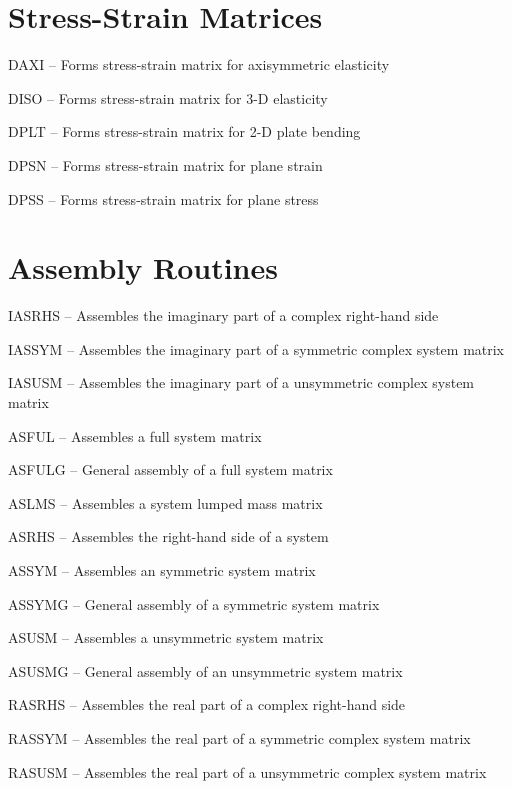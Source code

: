 \section{Stress-Strain Matrices}
\begin{list}{}{\leftmargin=57pt }
\item[DAXI \hfill]   -- Forms stress-strain matrix for axisymmetric elasticity
\item[DISO \hfill]   -- Forms stress-strain matrix for 3-D elasticity
\item[DPLT \hfill]   -- Forms stress-strain matrix for 2-D plate bending
\item[DPSN \hfill]   -- Forms stress-strain matrix for plane strain
\item[DPSS \hfill]   -- Forms stress-strain matrix for plane stress
\end{list}
\section{Assembly Routines}
\begin{list}{}{\leftmargin=57pt }
\item[IASRHS \hfill] -- Assembles the imaginary part of a complex right-hand side
\item[IASSYM \hfill] -- Assembles the imaginary part of a symmetric complex system matrix
\item[IASUSM \hfill] -- Assembles the imaginary part of a unsymmetric complex system matrix
\item[ASFUL \hfill]  -- Assembles a full system matrix
\item[ASFULG \hfill] -- General assembly of a full system matrix
\item[ASLMS \hfill]  -- Assembles a system lumped mass matrix
\item[ASRHS \hfill]  -- Assembles the right-hand side of a system
\item[ASSYM \hfill]  -- Assembles an symmetric system matrix
\item[ASSYMG \hfill] -- General assembly of a symmetric system matrix
\item[ASUSM \hfill]  -- Assembles a unsymmetric system matrix
\item[ASUSMG \hfill] -- General assembly of an unsymmetric system matrix
\item[RASRHS \hfill] -- Assembles the real part of a complex right-hand side
\item[RASSYM \hfill] -- Assembles the real part of a symmetric complex system matrix
\item[RASUSM \hfill] -- Assembles the real part of a unsymmetric complex system matrix
\end{list}
